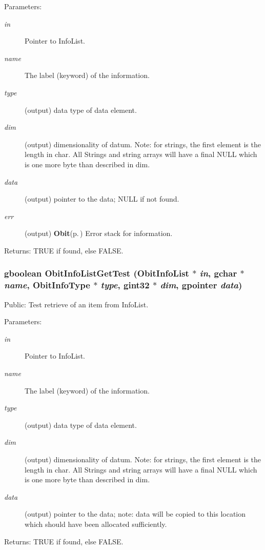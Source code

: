 \begin{Desc}
\item[Parameters:]
\begin{description}
\item[{\em in}]Pointer to Info\-List. \item[{\em name}]The label (keyword) of the information. \item[{\em type}](output) data type of data element. \item[{\em dim}](output) dimensionality of datum. Note: for strings, the first element is the length in char. All Strings and string arrays will have a final NULL which is one more byte than described in dim. \item[{\em data}](output) pointer to the data; NULL if not found. \item[{\em err}](output) {\bf Obit}{\rm (p.\,\pageref{structObit})} Error stack for information. \end{description}
\end{Desc}
\begin{Desc}
\item[Returns:]TRUE if found, else FALSE. \end{Desc}
\subsubsection{\setlength{\rightskip}{0pt plus 5cm}gboolean Obit\-Info\-List\-Get\-Test ({\bf Obit\-Info\-List} $\ast$ {\em in}, gchar $\ast$ {\em name}, Obit\-Info\-Type $\ast$ {\em type}, gint32 $\ast$ {\em dim}, gpointer {\em data})}\label{ObitInfoList_8c_a14}


Public: Test retrieve of an item from Info\-List. 

\begin{Desc}
\item[Parameters:]
\begin{description}
\item[{\em in}]Pointer to Info\-List. \item[{\em name}]The label (keyword) of the information. \item[{\em type}](output) data type of data element. \item[{\em dim}](output) dimensionality of datum. Note: for strings, the first element is the length in char. All Strings and string arrays will have a final NULL which is one more byte than described in dim. \item[{\em data}](output) pointer to the data; note: data will be copied to this location which should have been allocated sufficiently. \end{description}
\end{Desc}
\begin{Desc}
\item[Returns:]TRUE if found, else FALSE. \end{Desc}
